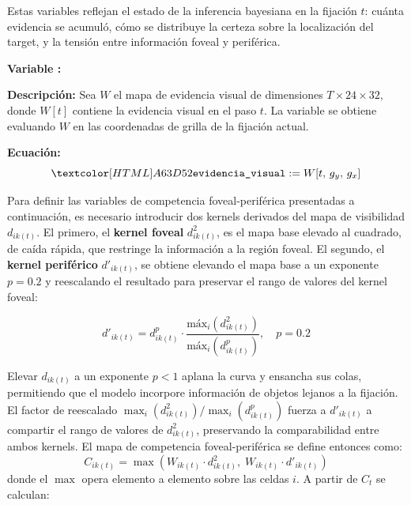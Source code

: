 Estas variables reflejan el estado de la inferencia bayesiana en la
fijación $t$: cuánta evidencia se acumuló, cómo se distribuye
la certeza sobre la localización del target, y la tensión entre
información foveal y periférica.

\begin{featuredef}
\textbf{Variable \thetcbcounter:} 

\textbf{Descripción:} Sea $W$ el mapa de evidencia visual de dimensiones
$T \times 24 \times 32$, donde $W[t]$ contiene la evidencia visual en el paso $t$.
La variable se obtiene evaluando $W$ en las coordenadas de grilla de la fijación actual.

\textbf{Ecuación:}
\begin{equation}
    \feat{evidencia\_visual} := W[t,\, g_y,\, g_x]
\end{equation}
\end{featuredef}

Para definir las variables de competencia foveal-periférica presentadas a
continuación, es necesario introducir dos kernels derivados del mapa de
visibilidad $d_{ik(t)}$. El primero, el \textbf{kernel foveal} $d^2_{ik(t)}$, es
el mapa base elevado al cuadrado, de caída rápida, que restringe la información a
la región foveal. El segundo, el \textbf{kernel periférico} $d'_{ik(t)}$, se
obtiene elevando el mapa base a un exponente $p = 0.2$ \citep{ruarte2025} y reescalando el resultado
para preservar el rango de valores del kernel foveal:

\begin{equation}
    d'_{ik(t)} = d^p_{ik(t)} \cdot \frac{\text{máx}_i\left(d^2_{ik(t)}\right)}{\text{máx}_i\left(d^p_{ik(t)}\right)}, \quad p = 0.2
\end{equation}


Elevar $d_{ik(t)}$ a un exponente $p < 1$ aplana la curva y ensancha 
sus colas, permitiendo que el modelo incorpore información de objetos lejanos a la fijación. El factor de reescalado 
$\max_i(d^2_{ik(t)})/\max_i(d^p_{ik(t)})$ fuerza a $d'_{ik(t)}$ a 
compartir el rango de valores de $d^2_{ik(t)}$, preservando la 
comparabilidad entre ambos kernels. El mapa de competencia 
foveal-periférica se define entonces como:
\begin{equation}
    C_{ik(t)} = \max\!\left(W_{ik(t)} \cdot d^2_{ik(t)},\;
                            W_{ik(t)} \cdot d'_{ik(t)}\right)
\end{equation}
donde el $\max$ opera elemento a elemento sobre las celdas $i$. 
A partir de $C_t$ se calculan:

